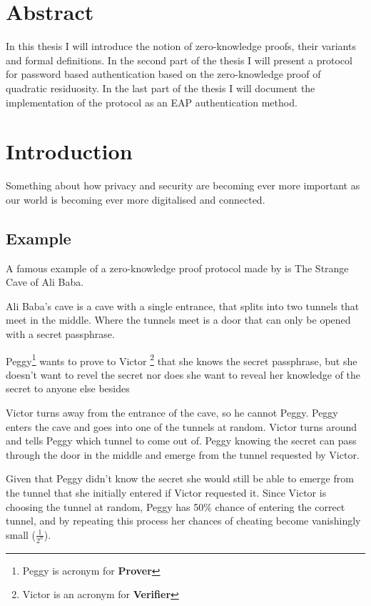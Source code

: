 \section{Abstract}
In this thesis I will introduce the notion of zero-knowledge proofs, their variants and formal definitions.
In the second part of the thesis I will present a protocol for password based authentication based on the zero-knowledge proof of quadratic residuosity.
In the last part of the thesis I will document the implementation of the protocol as an EAP authentication method.

\newpage

\section{Introduction}
Something about how privacy and security are becoming ever more important as our world is becoming ever more digitalised and connected.

\subsection{Example}

A famous example of a zero-knowledge proof protocol made by \cite{QJM} is The Strange Cave of Ali Baba.

\bigskip

Ali Baba's cave is a cave with a single entrance, that splits into two tunnels that meet in the middle. Where the tunnels meet is a door that can only be opened with a secret passphrase.

\bigskip

Peggy\footnote{Peggy is acronym for \textbf{Prover}} wants to prove to Victor \footnote{Victor is an acronym for \textbf{Verifier}} that she knows the secret passphrase, but she doesn't want to revel the secret nor does she want to reveal her knowledge of the secret to anyone else besides 

\bigskip

Victor turns away from the entrance of the cave, so he cannot Peggy. Peggy enters the cave and goes into one of the tunnels at random. Victor turns around and tells Peggy which tunnel to come out of. Peggy knowing the secret can pass through the door in the middle and emerge from the tunnel requested by Victor.

\bigskip

Given that Peggy didn't know the secret she would still be able to emerge from the tunnel that she initially entered if Victor requested it. Since Victor is choosing the tunnel at random, Peggy has 50\% chance of entering the correct tunnel, and by repeating this process her chances of cheating become vanishingly small ($\frac{1}{2^n}$).

